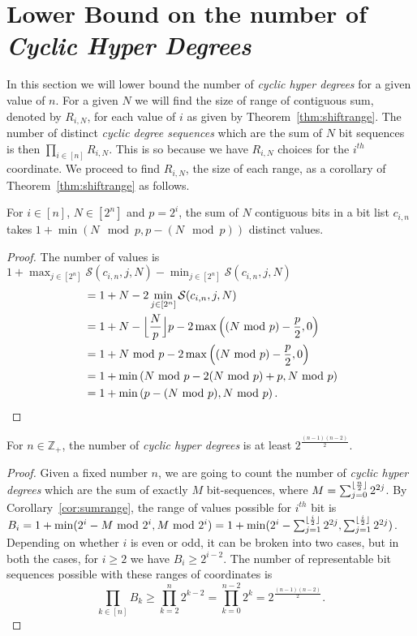 \section{Lower Bound on the number of {\em Cyclic Hyper Degrees}}

In this section we will lower bound the number of {\em cyclic hyper degrees} for a given value of $n$.
For a given $N$ we will find the size of range of contiguous sum, denoted by $R_{i,N}$, for each value of $i$ as given by Theorem~\ref{thm:shiftrange}. The number of distinct {\em cyclic degree sequences} which are the sum of $N$ bit sequences is then $\prod_{i\in [n]} R_{i,N}$. This is so because we have $R_{i,N}$ choices for the $i^{th}$ coordinate.
We proceed to find $R_{i,N}$, the size of each range, as a corollary of Theorem~\ref{thm:shiftrange} as follows.

\begin{corollary}
\label{cor:sumrange}
 For $i \in [n]$, $N\in[2^{n}]$ and $p=2^i$, the sum of $N$ contiguous bits in a bit list $c_{i,n}$ takes $1+ \min (N\mod p, p-  (N\mod p))$  distinct values.
\end{corollary}
\begin{proof}
 The number of values is  $1+\max_{j \in [2^n]} \mathcal{S}(c_{i,n}, j, N) -\min_{j \in [2^n]} \mathcal{S}(c_{i,n}, j, N)$
\begin{align*}
   &= 1+N-2\min_{j \in [2^n]} \mathcal{S}(c_{i,n}, j, N)\\
   &= 1+N-\floor[\Big]{\frac{N}{p}}p - 2\max \left( (N\mod p) - \frac{p}{2}, 0 \right)\\
   &= 1+N\mod p - 2\max \left( (N\mod p) - \frac{p}{2}, 0 \right)\\
   &= 1+ \min \left( N\mod p - 2 (N\mod p) +p, N\mod p \right)\\
   &= 1+ \min \left( p-  (N\mod p), N\mod p \right).
\end{align*}
\end{proof}

\begin{lemma}
\label{lem:lower}
 For $n\in \mathbb{Z}_+$, the number of {\em cyclic hyper degrees} is at least $2^{\frac{(n-1)(n-2)}{2}}$.
\end{lemma}
\begin{proof}
Given a fixed number $n$, we are going to count the number of {\em cyclic hyper degrees} which are the sum of exactly $M$ bit-sequences, where $M= \sum_{j=0}^{\floor{\frac{n}{2}}} 2^{2j}$. By Corollary~\ref{cor:sumrange}, the range of values possible for $i^{th}$ bit is $B_i=1+\min(2^i-M \mod 2^i, M \mod 2^i)=1+\min(2^i-\sum_{j=1}^{\floor{\frac{i}{2}}} 2^{2j},\sum_{j=1}^{\floor{\frac{i}{2}}} 2^{2j})$. Depending on whether $i$ is even or odd, it can be broken into two cases,  but in both the cases, for $i\geq 2$ we have $B_i\geq 2^{i-2}$.
The number of representable bit sequences possible with these ranges of coordinates is
$$
\prod_{k\in [n]} B_k
\geq \prod_{k=2}^n 2^{k-2}
= \prod_{k=0}^{n-2} 2^k
= 2^{\frac{(n-1)(n-2)}{2}}.
$$
\end{proof}
